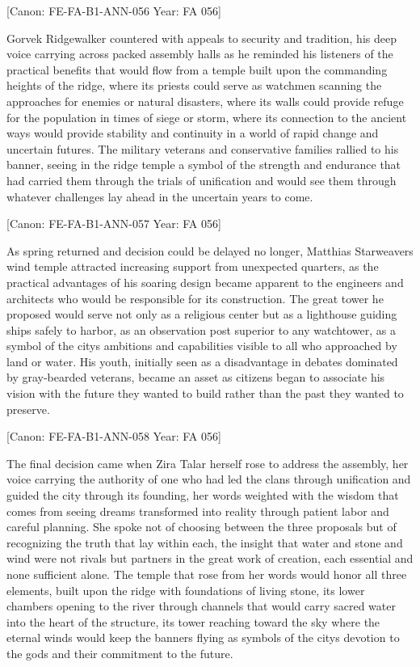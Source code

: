 {[}Canon: FE-FA-B1-ANN-056 \textbar{} Year: FA 056{]}

Gorvek Ridgewalker countered with appeals to security and tradition, his
deep voice carrying across packed assembly halls as he reminded his
listeners of the practical benefits that would flow from a temple built
upon the commanding heights of the ridge, where its priests could serve
as watchmen scanning the approaches for enemies or natural disasters,
where its walls could provide refuge for the population in times of
siege or storm, where its connection to the ancient ways would provide
stability and continuity in a world of rapid change and uncertain
futures. The military veterans and conservative families rallied to his
banner, seeing in the ridge temple a symbol of the strength and
endurance that had carried them through the trials of unification and
would see them through whatever challenges lay ahead in the uncertain
years to come.

{[}Canon: FE-FA-B1-ANN-057 \textbar{} Year: FA 056{]}

As spring returned and decision could be delayed no longer, Matthias
Starweaver\textquotesingle s wind temple attracted increasing support
from unexpected quarters, as the practical advantages of his soaring
design became apparent to the engineers and architects who would be
responsible for its construction. The great tower he proposed would
serve not only as a religious center but as a lighthouse guiding ships
safely to harbor, as an observation post superior to any watchtower, as
a symbol of the city\textquotesingle s ambitions and capabilities
visible to all who approached by land or water. His youth, initially
seen as a disadvantage in debates dominated by gray-bearded veterans,
became an asset as citizens began to associate his vision with the
future they wanted to build rather than the past they wanted to
preserve.

{[}Canon: FE-FA-B1-ANN-058 \textbar{} Year: FA 056{]}

The final decision came when Zira Talar herself rose to address the
assembly, her voice carrying the authority of one who had led the clans
through unification and guided the city through its founding, her words
weighted with the wisdom that comes from seeing dreams transformed into
reality through patient labor and careful planning. She spoke not of
choosing between the three proposals but of recognizing the truth that
lay within each, the insight that water and stone and wind were not
rivals but partners in the great work of creation, each essential and
none sufficient alone. The temple that rose from her words would honor
all three elements, built upon the ridge with foundations of living
stone, its lower chambers opening to the river through channels that
would carry sacred water into the heart of the structure, its tower
reaching toward the sky where the eternal winds would keep the banners
flying as symbols of the city\textquotesingle s devotion to the gods and
their commitment to the future.

